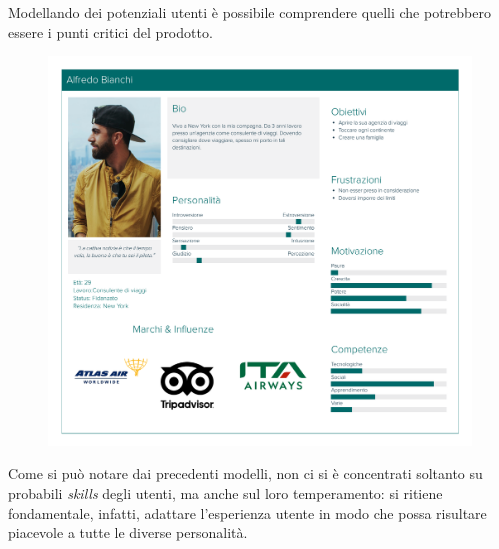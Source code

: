 \documentclass{natourDoc}
\begin{document}
\newpage
Modellando dei potenziali utenti è possibile comprendere quelli che potrebbero essere i punti critici del prodotto.
\begin{figure}[!htbp]
	\centering
	\includegraphics[width=\textwidth]{./personas/personas-bianchi.pdf}
\end{figure}

Come si può notare dai precedenti modelli, non ci si è concentrati soltanto su probabili \textit{skills} degli utenti, ma anche sul loro 
temperamento: si ritiene fondamentale, infatti, adattare l'esperienza utente in modo che possa risultare piacevole a tutte le diverse personalità.

\newpage

\end{document}
